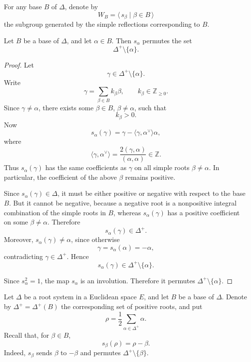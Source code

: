 For any base \(B\) of \(\Delta\), denote by
\[
    W_B
    =
    \langle\, s_\beta\mid \beta\in B\,\rangle
\]
the subgroup generated by the simple reflections corresponding to \(B\).

\begin{lemma}
    Let \(B\) be a base of \(\Delta\), and let \(\alpha\in B\). Then
    \(s_\alpha\) permutes the set
    \[
        \Delta^+\setminus\{\alpha\}.
    \]
\end{lemma}

\begin{proof}
    Let
    \[
        \gamma\in \Delta^+\setminus\{\alpha\}.
    \]
    Write
    \[
        \gamma
        =
        \sum_{\beta\in B} k_\beta\beta,
        \qquad
        k_\beta\in\mathbb{Z}_{\geq 0}.
    \]
    Since \(\gamma\neq \alpha\), there exists some \(\beta\in B\), \(\beta\neq\alpha\),
    such that
    \[
        k_\beta>0.
    \]
    Now
    \[
        s_\alpha(\gamma)
        =
        \gamma-\langle \gamma,\alpha^\vee\rangle\alpha,
    \]
    where
    \[
        \langle \gamma,\alpha^\vee\rangle
        =
        \frac{2(\gamma,\alpha)}{(\alpha,\alpha)}
        \in\mathbb{Z}.
    \]
    Thus \(s_\alpha(\gamma)\) has the same coefficients as \(\gamma\) on all
    simple roots \(\beta\neq\alpha\). In particular, the coefficient of the above
    \(\beta\) remains positive.

    Since \(s_\alpha(\gamma)\in\Delta\), it must be either positive or negative
    with respect to the base \(B\). But it cannot be negative, because a negative
    root is a nonpositive integral combination of the simple roots in \(B\), whereas
    \(s_\alpha(\gamma)\) has a positive coefficient on some \(\beta\neq\alpha\).
    Therefore
    \[
        s_\alpha(\gamma)\in\Delta^+.
    \]
    Moreover, \(s_\alpha(\gamma)\neq\alpha\), since otherwise
    \[
        \gamma=s_\alpha(\alpha)=-\alpha,
    \]
    contradicting \(\gamma\in\Delta^+\). Hence
    \[
        s_\alpha(\gamma)\in \Delta^+\setminus\{\alpha\}.
    \]

    Since \(s_\alpha^2=1\), the map \(s_\alpha\) is an involution. Therefore it
    permutes \(\Delta^+\setminus\{\alpha\}\).
\end{proof}

Let \(\Delta\) be a root system in a Euclidean space \(E\), and let \(B\) be
a base of \(\Delta\). Denote by \(\Delta^+=\Delta^+(B)\) the corresponding
set of positive roots, and put
\[
    \rho=\frac12\sum_{\alpha\in\Delta^+}\alpha .
\]
Recall that, for \(\beta\in B\),
\[
    s_\beta(\rho)=\rho-\beta .
\]
Indeed, \(s_\beta\) sends \(\beta\) to \(-\beta\) and permutes
\(\Delta^+\setminus\{\beta\}\).

